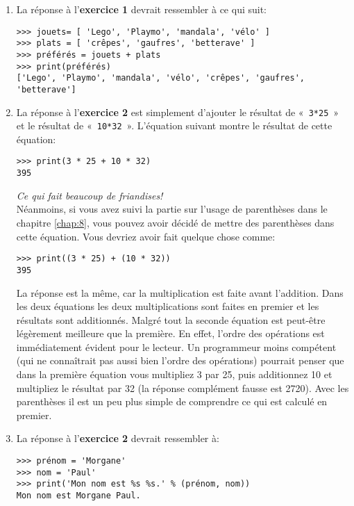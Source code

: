 \begin{enumerate}
\item La réponse à l'\textbf{exercice 1} devrait ressembler à ce qui suit:\\

\begin{small}
\begin{Verbatim}[frame=single,rulecolor=\color{mbleu}, label=à taper]
>>> jouets= [ 'Lego', 'Playmo', 'mandala', 'vélo' ]
>>> plats = [ 'crêpes', 'gaufres', 'betterave' ]
>>> préférés = jouets + plats
>>> print(préférés)
['Lego', 'Playmo', 'mandala', 'vélo', 'crêpes', 'gaufres', 'betterave']
\end{Verbatim}
\end{small}
\item  La réponse à l'\textbf{exercice 2} est simplement d'ajouter le résultat de «~\texttt{3*25}~» et le résultat de «~\texttt{10*32}~». L'équation suivant montre le résultat de cette équation:

\begin{Verbatim}[frame=single,rulecolor=\color{mbleu}, label=à taper]
>>> print(3 * 25 + 10 * 32)
395
\end{Verbatim}
\rm
\emph{Ce qui fait beaucoup de friandises!}\\

Néanmoins, si vous avez suivi la partie sur l'usage de parenthèses dans le chapitre \ref{chap:8}, vous pouvez avoir décidé de mettre des parenthèses dans cette équation. Vous devriez avoir fait quelque chose comme:
\tt
\begin{Verbatim}[frame=single,rulecolor=\color{mbleu}, label=à taper]
>>> print((3 * 25) + (10 * 32))
395
\end{Verbatim}
\rm

La réponse est la même, car la multiplication est faite avant l'addition. Dans les deux équations les deux multiplications sont faites en premier et les résultats sont additionnés. Malgré tout la seconde équation est peut-être légèrement meilleure que la première. En effet, l'ordre des opérations est immédiatement évident pour le lecteur. Un programmeur moins compétent (qui ne connaîtrait pas aussi bien l'ordre des opérations) pourrait penser que dans la première équation vous multipliez 3 par 25, puis additionnez 10 et multipliez le résultat par 32 (la réponse complément fausse est 2720). Avec les parenthèses il est un peu plus simple de comprendre ce qui est calculé en premier.

\item  La réponse à l'\textbf{exercice 2} devrait ressembler à:
\tt
\begin{Verbatim}[frame=single,rulecolor=\color{mbleu}, label=à taper]
>>> prénom = 'Morgane'
>>> nom = 'Paul'
>>> print('Mon nom est %s %s.' % (prénom, nom))
Mon nom est Morgane Paul.
\end{Verbatim}
\rm

\end{enumerate}

